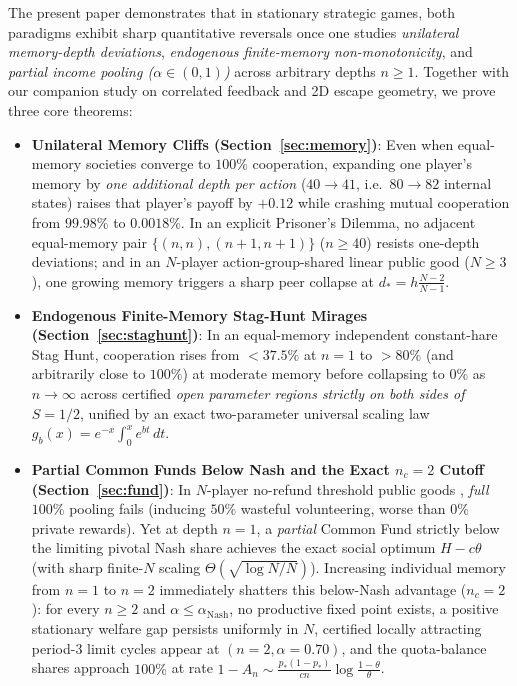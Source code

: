 \documentclass[11pt,reqno]{amsart}
\theoremstyle{definition}
\theoremstyle{remark}
\begin{document}
The present paper demonstrates that in stationary strategic games, both paradigms exhibit sharp quantitative reversals once one studies \emph{unilateral memory-depth deviations}, \emph{endogenous finite-memory non-monotonicity}, and \emph{partial income pooling ($\alpha \in (0,1)$)} across arbitrary depths $n \ge 1$. Together with our companion study \cite{Paper1} on correlated feedback and 2D escape geometry, we prove three core theorems:
\begin{itemize}
  \item \textbf{Unilateral Memory Cliffs (Section~\ref{sec:memory})}: Even when equal-memory societies converge to $100\%$ cooperation, expanding one player's memory by \emph{one additional depth per action} ($40 \to 41$, i.e.\ $80 \to 82$ internal states) raises that player's payoff by $+0.12$ while crashing mutual cooperation from $99.98\%$ to $0.0018\%$. In an explicit Prisoner's Dilemma, no adjacent equal-memory pair $\{(n,n),(n+1,n+1)\}$ ($n \ge 40$) resists one-depth deviations; and in an $N$-player action-group-shared linear public good ($N \ge 3$), one growing memory triggers a sharp peer collapse at $d_* = h\frac{N-2}{N-1}$.
  \item \textbf{Endogenous Finite-Memory Stag-Hunt Mirages (Section~\ref{sec:staghunt})}: In an equal-memory independent constant-hare Stag Hunt, cooperation rises from $<37.5\%$ at $n=1$ to $>80\%$ (and arbitrarily close to $100\%$) at moderate memory before collapsing to $0\%$ as $n \to \infty$ across certified \emph{open parameter regions strictly on both sides of $S=1/2$}, unified by an exact two-parameter universal scaling law $g_b(x) = e^{-x}\int_0^x e^{bt}\,dt$.
  \item \textbf{Partial Common Funds Below Nash and the Exact $n_c = 2$ Cutoff (Section~\ref{sec:fund})}: In $N$-player no-refund threshold public goods \cite{PalfreyRosenthal1984}, \emph{full} $100\%$ pooling fails (inducing $50\%$ wasteful volunteering, worse than $0\%$ private rewards). Yet at depth $n=1$, a \emph{partial} Common Fund strictly below the limiting pivotal Nash share achieves the exact social optimum $H - c\theta$ (with sharp finite-$N$ scaling $\Theta(\sqrt{\log N/N})$). Increasing individual memory from $n=1$ to $n=2$ immediately shatters this below-Nash advantage ($n_c = 2$): for every $n \ge 2$ and $\alpha \le \alpha_{\mathrm{Nash}}$, no productive fixed point exists, a positive stationary welfare gap persists uniformly in $N$, certified locally attracting period-$3$ limit cycles appear at $(n=2, \alpha=0.70)$, and the quota-balance shares approach $100\%$ at rate $1 - A_n \sim \frac{p_*(1-p_*)}{c n}\log\frac{1-\theta}{\theta}$.
\end{itemize}
\end{document}
